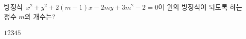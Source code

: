 방정식~$x^2+y^2+2(m-1)x-2my+3m^2-2=0$이 원의 방정식이 되도록 하는 정수 $m$의 개수는?
\begin{choices32}{$1$}{$2$}{$3$}{$4$}{$5$}\end{choices32}
